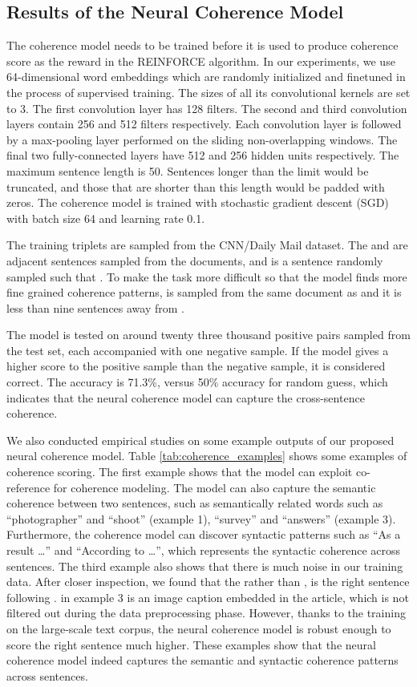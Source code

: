 \documentclass[letterpaper]{article} \usepackage{aaai18}  \usepackage{times}  \usepackage{helvet}  \usepackage{courier}  \usepackage{url}  \usepackage{graphicx}  \usepackage{amssymb}
\begin{document}
	\subsection{Results of the Neural Coherence Model}
	The coherence model needs to be trained before it is used to produce coherence score as the reward in the REINFORCE algorithm. In our experiments,  we use 64-dimensional word embeddings which are randomly initialized and finetuned in the process of supervised training. The sizes of all its convolutional kernels are set to 3. The first convolution layer has 128 filters. The second and third convolution layers contain 256 and 512 filters respectively. Each convolution layer is followed by a max-pooling layer performed on the sliding non-overlapping  windows. The final two fully-connected layers have 512 and 256 hidden units respectively. The maximum sentence length is 50. Sentences longer than the limit would be truncated, and those that are shorter than this length would be padded with zeros. The coherence model is trained with stochastic gradient descent (SGD) with batch size 64 and learning rate 0.1. 
	
	The training triplets are sampled from the CNN/Daily Mail dataset. The  and  are adjacent sentences sampled from the documents, and  is a sentence randomly sampled such that . To make the task more difficult so that the model finds more fine grained coherence patterns,  is sampled from the same document as  and it is less than nine sentences away from .
	
	The model is tested on around twenty three thousand positive pairs sampled from the test set, each accompanied with one negative sample. If the model gives a higher score to the positive sample than the negative sample, it is considered correct. The accuracy is 71.3\%, versus 50\% accuracy for random guess, which indicates that the neural coherence model can capture the cross-sentence coherence.
	
	We also conducted empirical studies on some example outputs of our proposed neural coherence model. Table \ref{tab:coherence_examples} shows some examples of coherence scoring. The first example shows that the model can exploit co-reference for coherence modeling. The model can also capture the semantic coherence between two sentences, such as semantically related words such as ``photographer'' and ``shoot'' (example 1), ``survey'' and ``answers'' (example 3). Furthermore, the coherence model can discover syntactic patterns such as ``As a result \dots'' and ``According to \dots'', which represents the syntactic coherence across sentences. The third example also shows that there is much noise in our training data. After closer inspection, we found that the  rather than , is the right sentence following .  in example 3 is an image caption embedded in the article, which is not filtered out during the data preprocessing phase. However, thanks to the training on the large-scale text corpus, the neural coherence model is robust enough to score the right sentence much higher. These examples show that the neural coherence model indeed captures the semantic and syntactic coherence patterns across sentences.
\end{document}
